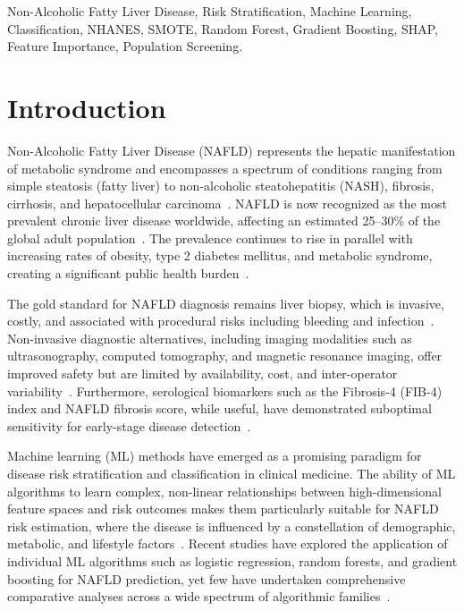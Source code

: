 \documentclass[conference,10pt]{IEEEtran}
\begin{document}
\begin{IEEEkeywords}
Non-Alcoholic Fatty Liver Disease, Risk Stratification, Machine Learning, Classification, NHANES, SMOTE, Random Forest, Gradient Boosting, SHAP, Feature Importance, Population Screening.
\end{IEEEkeywords}


\section{Introduction}
\label{sec:introduction}

Non-Alcoholic Fatty Liver Disease (NAFLD) represents the hepatic manifestation of metabolic syndrome and encompasses a spectrum of conditions ranging from simple steatosis (fatty liver) to non-alcoholic steatohepatitis (NASH), fibrosis, cirrhosis, and hepatocellular carcinoma~\cite{younossi2016global}. NAFLD is now recognized as the most prevalent chronic liver disease worldwide, affecting an estimated 25--30\% of the global adult population~\cite{chalasani2018diagnosis}. The prevalence continues to rise in parallel with increasing rates of obesity, type 2 diabetes mellitus, and metabolic syndrome, creating a significant public health burden~\cite{lazarus2022advancing}.

The gold standard for NAFLD diagnosis remains liver biopsy, which is invasive, costly, and associated with procedural risks including bleeding and infection~\cite{bravo2001liver}. Non-invasive diagnostic alternatives, including imaging modalities such as ultrasonography, computed tomography, and magnetic resonance imaging, offer improved safety but are limited by availability, cost, and inter-operator variability~\cite{hernaez2011diagnostic}. Furthermore, serological biomarkers such as the Fibrosis-4 (FIB-4) index and NAFLD fibrosis score, while useful, have demonstrated suboptimal sensitivity for early-stage disease detection~\cite{mcpherson2010simple}.

Machine learning (ML) methods have emerged as a promising paradigm for disease risk stratification and classification in clinical medicine. The ability of ML algorithms to learn complex, non-linear relationships between high-dimensional feature spaces and risk outcomes makes them particularly suitable for NAFLD risk estimation, where the disease is influenced by a constellation of demographic, metabolic, and lifestyle factors~\cite{singal2013machine}. Recent studies have explored the application of individual ML algorithms such as logistic regression, random forests, and gradient boosting for NAFLD prediction, yet few have undertaken comprehensive comparative analyses across a wide spectrum of algorithmic families~\cite{ma2021application}.
\end{document}
